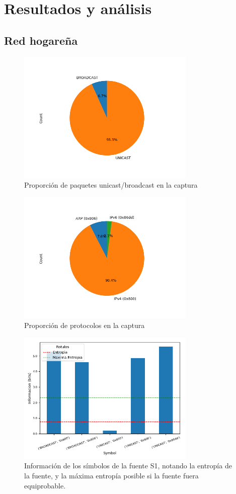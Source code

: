 \section{Resultados y análisis}
\subsection*{Red hogareña}
\begin{figure}[H]
  \centering
  \includegraphics[width=8.5cm]{figs/broadcast_proportion_hogar_ethernet_S1_output.png}
  \caption{\normalfont Proporción de paquetes unicast/broadcast en la captura}
\end{figure}

\begin{figure}[H]
  \centering
  \includegraphics[width=8.5cm]{figs/protocols_proportion_hogar_ethernet_S1_output.png}
  \caption{\normalfont Proporción de protocolos en la captura}
\end{figure}

\begin{figure}[H]
  \centering
  \includegraphics[width=8.5cm]{figs/information_hogar_ethernet_S1_output.png}
  \caption{\normalfont Información de los símbolos de la fuente S1, notando la entropía de la fuente, y la máxima entropía posible si la fuente fuera equiprobable.}
\end{figure}

